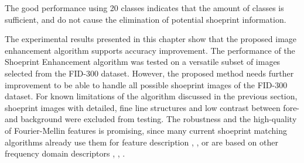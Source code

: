 \documentclass[draft,final]{vutinfth} %
\begin{document}
The good performance using 20 classes indicates that the amount of classes is sufficient, and do not cause the elimination of potential shoeprint information.
\par
The experimental results presented in this chapter show that the proposed image enhancement algorithm supports accuracy improvement.
The performance of the Shoeprint Enhancement  algorithm was tested on a versatile subset of images selected from the FID-300 dataset.
However, the proposed method needs further improvement to be able to handle all possible shoeprint images of the FID-300 dataset.
For known limitations of the algorithm discussed in the previous section, shoeprint images with detailed, fine line structures and low contrast between fore- and background were excluded from testing.
The robustness and the high-quality of Fourier-Mellin features is promising, since many current shoeprint matching algorithms already use them for feature description  \cite{gueham2008automatic}, \cite{richetelli2017classification}, \cite{wu2019crime} or are based on other frequency domain descriptors \cite{algarni2008novel}, \cite{wang2014automatic}, \cite{katireddy2017novel}. 
\end{document}
